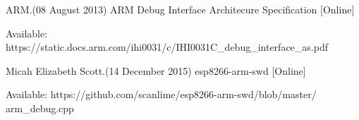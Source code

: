 \documentclass[]{esogu}			%
\begin{document}
\mainmatter %
\setcounter{secnumdepth}{5} %










\newpage
\begin{thebibliography}{9}

ARM.(08 August 2013) ARM Debug Interface Architecure Specification [Online]

Available: https://static.docs.arm.com/ihi0031/c/IHI0031C\_debug\_interface\_as.pdf

Micah Elizabeth Scott.(14 December 2015) esp8266-arm-swd [Online]

Available: https://github.com/scanlime/esp8266-arm-swd/blob/master/\\arm\_debug.cpp
\end{thebibliography}

%


\end{document}
